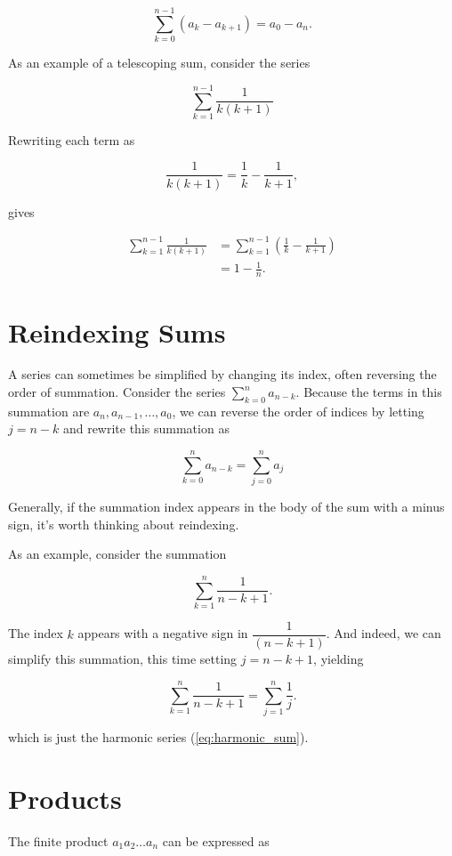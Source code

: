 \[
    \sum_{k=0}^{n-1}\left(a_k-a_{k+1}\right)=a_0-a_n .
\]

As an example of a telescoping sum, consider the series

\[
\sum_{k=1}^{n-1} \frac{1}{k(k+1)}
\]

Rewriting each term as

\[
\frac{1}{k(k+1)}=\frac{1}{k}-\frac{1}{k+1},
\]

gives

\begin{align}
\sum_{k=1}^{n-1} \frac{1}{k(k+1)} & =\sum_{k=1}^{n-1}\left(\frac{1}{k}-\frac{1}{k+1}\right) \nonumber \\
& =1-\frac{1}{n} . \label{eq:telescoping-example}
\end{align}

\section*{Reindexing Sums}
A series can sometimes be simplified by changing its index, often reversing the order of summation. Consider the series $\sum_{k=0}^n a_{n-k}$. Because the terms in this summation are $a_n, a_{n-1}, \ldots, a_0$, we can reverse the order of indices by letting $j=n-k$ and rewrite this summation as

$$
\sum_{k=0}^n a_{n-k}=\sum_{j=0}^n a_j
$$


Generally, if the summation index appears in the body of the sum with a minus sign, it's worth thinking about reindexing.

As an example, consider the summation

\begin{equation}
    \sum_{k=1}^n \frac{1}{n-k+1} . \label{eq:reindexing-example}
\end{equation}


The index $k$ appears with a negative sign in $\dfrac{1}{(n-k+1)}$. And indeed, we can simplify this summation, this time setting $j=n-k+1$, yielding

\begin{equation}
    \sum_{k=1}^n \frac{1}{n-k+1}=\sum_{j=1}^n \frac{1}{j}. \label{eq:reindexing-example-solution}
\end{equation}

which is just the harmonic series (\ref{eq:harmonic_sum}).

\section*{Products}
The finite product $a_1 a_2 \ldots a_n$ can be expressed as

